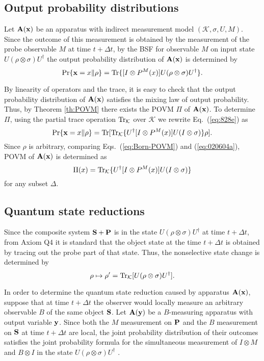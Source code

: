 \documentclass[12pt]{article}
\newcommand{\beq}{\begin{equation}}
\newcommand{\eeq}{\end{equation}}
\newcommand{\beql}[1]{\begin{equation}\label{eq:#1}}
\newcommand{\bA}{{\bf A}}
\newcommand{\bP}{{\bf P}}
\newcommand{\bS}{{\bf S}}
\newcommand{\cK}{{\mathcal K}}
\newcommand{\da}{\dagger}
\newcommand{\rh}{\rho}
\newcommand{\si}{\sigma}
\newcommand{\De}{\Delta}
\newcommand{\Eq}[1]{Eq.~(\ref{eq:#1})}
\newcommand{\Tr}{\mbox{\rm Tr}}
\newcommand{\bx}{{\bf x}}
\newcommand{\by}{{\bf y}}
\newcommand{\eq}[1]{(\ref{eq:#1})}
\begin{document}
\subsection{Output probability distributions}

Let $\bA(\bx)$ be an apparatus with
indirect measurement model
$(\cK,\si,U,M)$.
Since the outcome
of this measurement is obtained by the measurement of 
the probe observable $M$ at time $t+\De t$, 
by the BSF for observable $M$ on input state $U(\rh\otimes\si)U^{\da}$
the output probability distribution of $\bA(\bx)$ is determined 
by
\beql{828e}
\Pr\{\bx=x\|\rh\}
=\Tr\{[I\otimes P^{M}(x)]U(\rh\otimes\si)U^{\da}\}.
	\eeq


By linearity of operators and the trace, it is easy to check that
the output probability distribution of $\bA(\bx)$ satisfies the
mixing law of output probability.
Thus, by Theorem \ref{th:POVM} there exists the POVM  $\Pi$ of 
$\bA(\bx)$.
To determine $\Pi$, 
using the partial trace operation $\Tr_{\cK}$ over $\cK$ 
we rewrite \Eq{828e} as
\beql{020604a}
\Pr\{\bx=x\|\rh\}
=\Tr[\Tr_{\cK}\{U^{\da}[I\otimes P^{M}(x)]U(I\otimes\si)\}\rh].
\eeq
Since $\rh$ is arbitrary, comparing Eqs.~\eq{Born-POVM} and
\eq{020604a}, POVM of $\bA(\bx)$ is determined  as
\beq
\Pi(x)=\Tr_{\cK}\{U^{\da}[I\otimes P^{M}(x)]U(I\otimes\si)\}
\eeq
for any subset $\De$.

 
\subsection{Quantum state reductions}

Since the composite system $\bS+\bP$ is in the state
$U(\rh\otimes\si)U^{\da}$ at time $t+\De t$, from Axiom Q4
it is standard  that the object state at the time $t+\De t$
is obtained by tracing out the probe part of that state.
Thus, the nonselective state change is determined by
\begin{equation}  \rh\mapsto\rh'=
\Tr_{{\cal K}}[U(\rh\otimes\sigma)U^{\dagger}].
\end{equation}

In order to determine the quantum state reduction
caused by apparatus $\bA(\bx)$, 
suppose that at time $t+\Delta t$
the observer would locally measure
an arbitrary observable $B$
of the same object ${\bf S}$.  
Let $\bA(\by)$ be a $B$-measuring apparatus
with output variable $\by$.
Since both the $M$ measurement on $\bP$ and the $B$ measurement
on $\bS$ at time $t+\Delta t$ are local, 
the joint probability distribution of their outcomes  
satisfies the joint probability formula for the
simultaneous measurement of $I\otimes M$ and 
$B\otimes I$ in the state 
$U(\rh\otimes\sigma)U^{\dagger}$ \cite{01OD}.
\end{document}
